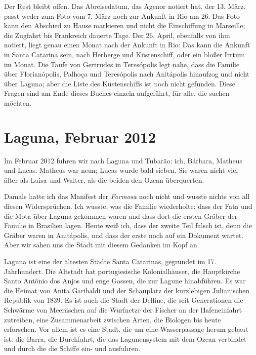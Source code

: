 \documentclass[
  ngerman,
  11pt,
  openany]{book}
\begin{document}
Der Rest bleibt offen. Das Abreisedatum, das Agenor notiert hat, der 13.
März, passt weder zum Foto vom 7. März noch zur Ankunft in Rio am 26.
Das Foto kann den Abschied zu Hause markieren und nicht die Einschiffung
in Marseille; die Zugfahrt bis Frankreich dauerte Tage. Der 26. April,
ebenfalls von ihm notiert, liegt genau einen Monat nach der Ankunft in
Rio: Das kann die Ankunft in Santa Catarina sein, nach Herberge und
Küstenschiff, oder ein bloßer Irrtum im Monat. Die Taufe von Gertrudes
in Teresópolis legt nahe, dass die Familie über Florianópolis, Palhoça
und Teresópolis nach Anitápolis hinaufzog und nicht über Laguna; aber
die Liste des Küstenschiffs ist noch nicht gefunden. Diese Fragen sind
am Ende dieses Buches einzeln aufgeführt, für alle, die suchen möchten.

\section{Laguna, Februar 2012}\label{laguna-februar-2012}

Im Februar 2012 fuhren wir nach Laguna und Tubarão: ich, Bárbara,
Matheus und Lucas. Matheus war neun; Lucas wurde bald sieben. Sie waren
nicht viel älter als Luisa und Walter, als die beiden den Ozean
überquerten.

Damals hatte ich das Manifest der \emph{Formosa} noch nicht und wusste
nichts von all diesen Widersprüchen. Ich wusste, was die Familie
wiederholte: dass der Fata und die Mota über Laguna gekommen waren und
dass dort die ersten Gräber der Familie in Brasilien lagen. Heute weiß
ich, dass der zweite Teil falsch ist, denn die Gräber waren in
Anitápolis, und dass der erste noch auf ein Dokument wartet. Aber wir
sahen uns die Stadt mit diesem Gedanken im Kopf an.

Laguna ist eine der ältesten Städte Santa Catarinas, gegründet im 17.
Jahrhundert. Die Altstadt hat portugiesische Kolonialhäuser, die
Hauptkirche Santo Antônio dos Anjos und enge Gassen, die zur Lagune
hinabführen. Es war die Heimat von Anita Garibaldi und der Schauplatz
der kurzlebigen Julianischen Republik von 1839. Es ist auch die Stadt
der Delfine, die seit Generationen die Schwärme von Meeräschen auf die
Wurfnetze der Fischer an der Hafeneinfahrt zutreiben, eine
Zusammenarbeit zwischen Arten, die Biologen bis heute erforschen. Vor
allem ist es eine Stadt, die um eine Wasserpassage herum gebaut ist: die
Barra, die Durchfahrt, die das Lagunensystem mit dem Ozean verbindet und
durch die die Schiffe ein- und ausfuhren.
\end{document}
